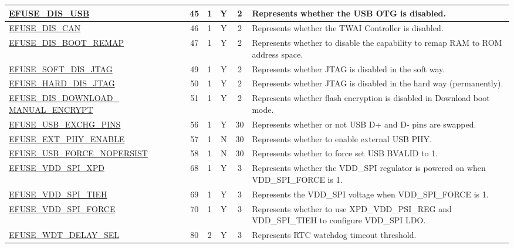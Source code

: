 \begin{longtable}[l]{ |m{5cm}|c|c|c|c|m{5cm}| }
    \hline
    \hyperref[fielddesc:EFUSEDISUSB]{EFUSE\_DIS\_USB} & 45 &  1 & Y & 2  & Represents whether the USB OTG is disabled.\\     
    \hline
    \hyperref[fielddesc:EFUSEDISCAN]{EFUSE\_DIS\_CAN} & 46 &  1 & Y & 2  & Represents whether the TWAI Controller is disabled.\\  
    \hline
    \hyperref[fielddesc:EFUSEDISBOOTREMAP]{EFUSE\_DIS\_BOOT\_REMAP} & 47 & 1 & Y & 2 & Represents whether to disable the capability to remap RAM to ROM address space.\\   
    \hline
    \hyperref[fielddesc:EFUSESOFTDISJTAG]{EFUSE\_SOFT\_DIS\_JTAG} & 49 & 1 & Y & 2 & Represents whether JTAG is disabled in the soft way.\\    
    \hline
    \hyperref[fielddesc:EFUSEHARDDISJTAG]{EFUSE\_HARD\_DIS\_JTAG} & 50 & 1 & Y & 2 & Represents whether JTAG is disabled in the hard way (permanently).\\   
    \hline
    \hyperref[fielddesc:EFUSEDISDOWNLOADMANUALENCRYPT]{EFUSE\_DIS\_DOWNLOAD\_ MANUAL\_ENCRYPT} & 51 &  1 & Y & 2 &Represents whether flash encryption is disabled in Download boot mode.\\ 
    \hline
    \hyperref[fielddesc:EFUSEUSBEXCHGPINS]{EFUSE\_USB\_EXCHG\_PINS} & 56 & 1 & Y & 30 & Represents whether or not USB D+ and D- pins are swapped.\\
    \hline
    \hyperref[fielddesc:EFUSEEXTPHYENABLE]{EFUSE\_EXT\_PHY\_ENABLE} & 57 & 1 & N & 30 & Represents whether to enable external USB PHY. \\
    \hline
    \hyperref[fielddesc:EFUSEUSBFORCENOPERSIST]{EFUSE\_USB\_FORCE\_NOPERSIST} & 58 & 1 & N & 30 & Represents whether to force set USB BVALID to 1. \\
    \hline
    \hyperref[fielddesc:EFUSEVDDSPIXPD]{EFUSE\_VDD\_SPI\_XPD} & 68 & 1 & Y & 3 & Represents whether the VDD\_SPI regulator is powered on when VDD\_SPI\_FORCE is 1. \\
    \hline
    \hyperref[fielddesc:EFUSEVDDSPITIEH]{EFUSE\_VDD\_SPI\_TIEH} & 69 & 1 & Y & 3 & Represents the VDD\_SPI voltage when VDD\_SPI\_FORCE is 1. \\ \hline
    \hyperref[fielddesc:EFUSEVDDSPIFORCE]{EFUSE\_VDD\_SPI\_FORCE} & 70 & 1 & Y & 3 & Represents whether to use XPD\_VDD\_PSI\_REG and VDD\_SPI\_TIEH to configure VDD\_SPI LDO. \\\hline
    \hyperref[fielddesc:EFUSEWDTDELAYSEL]{EFUSE\_WDT\_DELAY\_SEL} & 80 & 2 & Y & 3 & Represents RTC watchdog timeout threshold.\\

\end{longtable}
